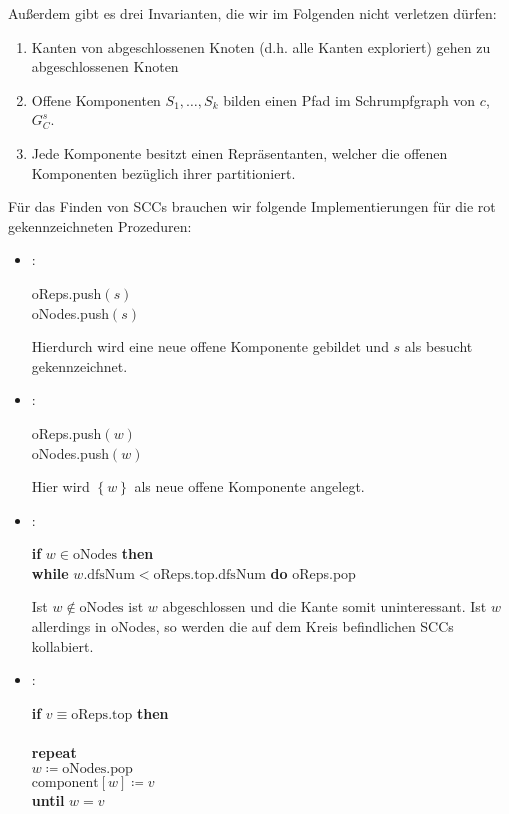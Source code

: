 Außerdem gibt es drei Invarianten, die wir im Folgenden nicht verletzen dürfen:
\begin{enumerate}
  \item Kanten von abgeschlossenen Knoten (d.h. alle Kanten exploriert) gehen zu abgeschlossenen Knoten
  \item Offene Komponenten \( S_1,\dots,S_k \) bilden einen Pfad im Schrumpfgraph von $c$, \( G_C^s \).
  \item Jede Komponente besitzt einen Repräsentanten, welcher die offenen Komponenten bezüglich ihrer  partitioniert.
\end{enumerate}

Für das Finden von SCCs brauchen wir folgende Implementierungen für die rot gekennzeichneten Prozeduren:
\begin{itemize}
  \item \textbf{}:
  \begin{pseudocode}
    oReps.push\( (s) \) \\
    oNodes.push\( (s) \)
  \end{pseudocode}
  Hierdurch wird eine neue offene Komponente gebildet und \( s \) als besucht gekennzeichnet.

  \item \textbf{}:
  \begin{pseudocode}
    oReps.push\( (w) \) \\
    oNodes.push\( (w) \)
  \end{pseudocode}
  Hier wird \( \left \{ w \right \} \) als neue offene Komponente angelegt.

  \item \textbf{}:
  \begin{pseudocode}
    \textbf{if} \( w \in \text{oNodes} \) \textbf{then} \\
    \phantom{\enskip} \textbf{while} \( w\text{.dfsNum} < \text{oReps.top.dfsNum} \) \textbf{do} oReps.pop
  \end{pseudocode}
  Ist \( w \not \in \text{oNodes} \) ist \( w \) abgeschlossen und die Kante somit uninteressant. Ist \( w \) allerdings in oNodes, so werden die auf dem Kreis befindlichen SCCs kollabiert.

  \item \textbf{}:
  \begin{pseudocode}
    \textbf{if} \( v \equiv \text{oReps.top} \) \textbf{then} \\
    \phantom{\enskip}  \\
    \phantom{\enskip} \textbf{repeat} \\
    \phantom{\enskip} \phantom{\enskip} \( w \coloneqq \text{oNodes.pop} \) \\
    \phantom{\enskip} \phantom{\enskip} \( \text{component}[w] \coloneqq v \) \\
    \phantom{\enskip} \textbf{until} \( w = v \)
  \end{pseudocode}
\end{itemize}

